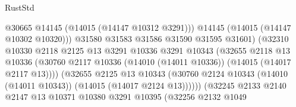 \begin{lexlean}{RustStd}
\begin{coremodule}
                                              @30665
                                              @14145
                                              (@14015 (@14147 @10312 @3291)))
                                            @14145
                                            (@14015 (@14147 @10302 @10320)))
                                          @31580
                                          @31583
                                          @31586
                                          @31590
                                          @31595
                                          @31601)
                                        (@32310
                                          @10330
                                          @2118
                                          @2125
                                          @13
                                          @3291
                                          @10336
                                          @3291
                                          @10343
                                          (@32655
                                            @2118
                                            @13
                                            @10336
                                            (@30760
                                              @2117
                                              @10336
                                              (@14010 (@14011 @10336))
                                              (@14015 (@14017 @2117 @13))))
                                          (@32655
                                            @2125
                                            @13
                                            @10343
                                            (@30760
                                              @2124
                                              @10343
                                              (@14010 (@14011 @10343))
                                              (@14015 (@14017 @2124 @13))))))
                                      (@32245
                                        @2133
                                        @2140
                                        @2147
                                        @13
                                        @10371
                                        @10380
                                        @3291
                                        @10395
                                        (@32256
                                          @2132
                                          @1049

\end{coremodule}
\end{lexlean}
